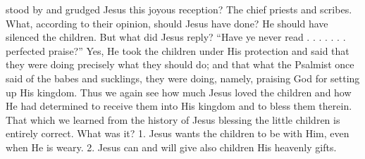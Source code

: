 stood by and grudged Jesus this joyous reception? The chief priests and scribes. What, according to their opinion, should Jesus have done? He should have silenced the children. But what did Jesus reply? “Have ye never read . . . . . . . perfected praise?” Yes, He took the children under His protection and said that they were doing precisely what they should do; and that what the Psalmist once said of the babes and sucklings, they were doing, namely, praising God for setting up His kingdom. Thus we again see how much Jesus loved the children and how He had determined to receive them into His kingdom and to bless them therein. That which we learned from the history of Jesus blessing the little children is entirely correct. What was it? 1. Jesus wants the children to be with Him, even when He is weary. 2. Jesus can and will give also children His heavenly gifts.

